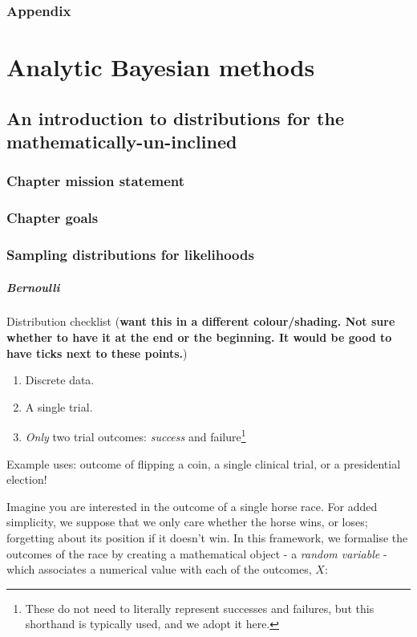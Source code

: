 \documentclass[11pt,fullpage]{book}
\begin{document}
\section{Appendix}\label{sec:Denominator_appendix}

\part{Analytic Bayesian methods}\label{part:analyticalBayes}
\chapter{An introduction to distributions for the mathematically-un-inclined}\label{chap:distributions}
\section{Chapter mission statement}
\section{Chapter goals}

\section{Sampling distributions for likelihoods}
\subsubsection{Bernoulli}\label{sec:Distributions_bernoulli}

Distribution checklist (\textbf{want this in a different colour/shading. Not sure whether to have it at the end or the beginning. It would be good to have ticks next to these points.})

\begin{enumerate}
\item Discrete data.
\item A single trial.
\item \textit{Only} two trial outcomes: \textit{success} and failure\footnote{These do not need to literally represent successes and failures, but this shorthand is typically used, and we adopt it here.}
\end{enumerate}

Example uses: outcome of flipping a coin, a single clinical trial, or a presidential election!

Imagine you are interested in the outcome of a single horse race. For added simplicity, we suppose that we only care whether the horse wins, or loses; forgetting about its position if it doesn't win. In this framework, we formalise the outcomes of the race by creating a mathematical object - a \textit{random variable} - which associates a numerical value with each of the outcomes, $X$:
\end{document}
